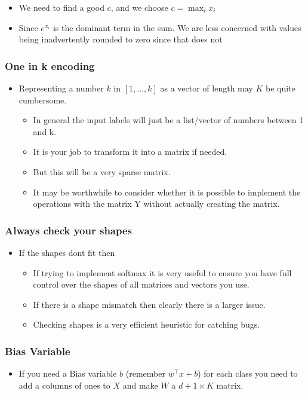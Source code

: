 \documentclass[11pt]{article}
\begin{document}
\begin{itemize}
\item We need to find a good \(c\), and we choose \(c = \max_i x_i\)
\item Since \(e^{x_i}\) is the dominant term in the sum. We are less concerned with values being inadvertently rounded to zero since that does not
\end{itemize}

\subsubsection{One in k encoding}
\label{sec:org172793e}
\begin{itemize}
\item Representing a number \(k\) in \([1,\dots,k]\) as a vector of length may \(K\) be quite cumbersome.
\begin{itemize}
\item In general the input labels will just be a list/vector of numbers between 1 and k.
\item It is your job to transform it into a matrix if needed.
\item But this will be a very sparse matrix.
\item It may be worthwhile to consider whether it is possible to implement the operations with the matrix Y without actually creating the matrix.
\end{itemize}
\end{itemize}

\subsubsection{Always check your shapes}
\label{sec:orgff5560e}
\begin{itemize}
\item If the shapes dont fit then
\begin{itemize}
\item If trying to implement softmax it is very useful to ensure you have full control over the shapes of all matrices and vectors you use.
\item If there is a shape mismatch then clearly there is a larger issue.
\item Checking shapes is a very efficient heuristic for catching bugs.
\end{itemize}
\end{itemize}

\subsubsection{Bias Variable}
\label{sec:orgba13b6c}
\begin{itemize}
\item If you need a Bias variable \(b\) (remember \(w^\intercal x + b\)) for each class you need to add a columns of ones to \(X\) and make \(W\) a \(d+1 \times K\) matrix.
\end{itemize}
\end{document}

